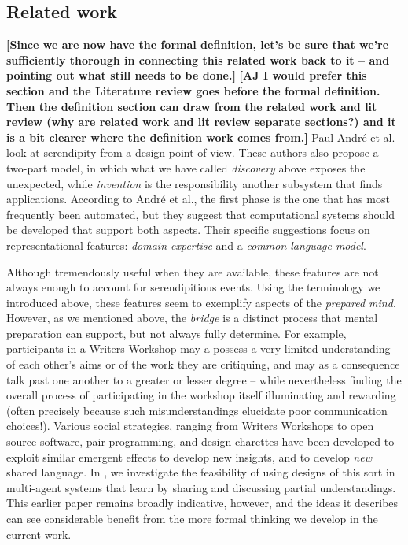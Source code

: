 \subsection{Related work} \label{sec:related}

\textbf{[Since we are now have the formal definition, let's be sure
    that we're sufficiently thorough in connecting this related work
    back to it -- and pointing out what still needs to be done.]}
\textbf{[AJ I would prefer this section and the Literature review goes before the formal definition. Then the definition section can draw from the related work and lit review (why are related work and lit review separate sections?) and it is a bit clearer where the definition work comes from.]}
Paul Andr{\'e} et al.~\citeyear{andre2009discovery} look at
serendipity from a design point of view.  These authors also propose a
two-part model, in which what we have called \emph{discovery} above
exposes the unexpected, while \emph{invention} is the responsibility
another subsystem that finds applications.  According to Andr\'e et
al., the first phase is the one that has most frequently been
automated, but they suggest that computational systems should be
developed that support both aspects.  Their specific suggestions focus
on representational features: \emph{domain expertise} and a
\emph{common language model}.

Although tremendously useful when they are available, these features
are not always enough to account for serendipitious events.  Using the
terminology we introduced above, these features seem to exemplify
aspects of the \emph{prepared mind}.  However, as we mentioned above,
the \emph{bridge} is a distinct process that mental preparation can
support, but not always fully determine.  For example, participants in
a Writers Workshop may a possess a very limited understanding of each
other's aims or of the work they are critiquing, and may as a
consequence talk past one another to a greater or lesser degree --
while nevertheless finding the overall process of participating in the
workshop itself illuminating and rewarding (often precisely because
such misunderstandings elucidate poor communication choices!).
Various social strategies, ranging from Writers Workshops to open
source software, pair programming, and design charettes
\cite[p. 11]{gabriel2002writer} have been developed to exploit similar
emergent effects to develop new insights, and to develop \emph{new}
shared language.  In \cite{poetry-workshop}, we investigate the
feasibility of using designs of this sort in multi-agent systems that
learn by sharing and discussing partial understandings.  This earlier
paper remains broadly indicative, however, and the ideas it describes
can see considerable benefit from the more formal thinking we develop
in the current work.

